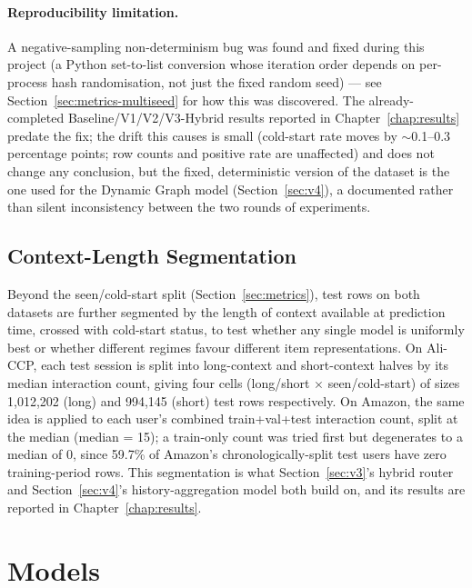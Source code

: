 \documentclass{uclthesis}
\begin{document}
\paragraph{Reproducibility limitation.} A negative-sampling non-determinism bug was found and fixed during this project (a Python set-to-list conversion whose iteration order depends on per-process hash randomisation, not just the fixed random seed) --- see Section~\ref{sec:metrics-multiseed} for how this was discovered. The already-completed Baseline/V1/V2/V3-Hybrid results reported in Chapter~\ref{chap:results} predate the fix; the drift this causes is small (cold-start rate moves by $\sim$0.1--0.3 percentage points; row counts and positive rate are unaffected) and does not change any conclusion, but the fixed, deterministic version of the dataset is the one used for the Dynamic Graph model (Section~\ref{sec:v4}), a documented rather than silent inconsistency between the two rounds of experiments.

\subsection{Context-Length Segmentation}
\label{sec:context-segments}

Beyond the seen/cold-start split (Section~\ref{sec:metrics}), test rows on both datasets are further segmented by the length of context available at prediction time, crossed with cold-start status, to test whether any single model is uniformly best or whether different regimes favour different item representations. On Ali-CCP, each test session is split into long-context and short-context halves by its median interaction count, giving four cells (long/short $\times$ seen/cold-start) of sizes 1{,}012{,}202 (long) and 994{,}145 (short) test rows respectively. On Amazon, the same idea is applied to each user's combined train+val+test interaction count, split at the median (median = 15); a train-only count was tried first but degenerates to a median of 0, since 59.7\% of Amazon's chronologically-split test users have zero training-period rows. This segmentation is what Section~\ref{sec:v3}'s hybrid router and Section~\ref{sec:v4}'s history-aggregation model both build on, and its results are reported in Chapter~\ref{chap:results}.

\section{Models}
\label{sec:models}
\end{document}

